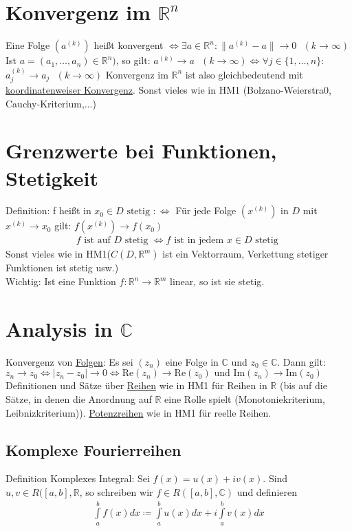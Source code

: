 \documentclass{article}
\begin{document}
\section{Konvergenz im $\mathbb{R}^n$}
Eine Folge $(a^{(k)})$ heißt konvergent $\Leftrightarrow \exists a \in \mathbb{R}^n: \lVert a^{(k)} - a \rVert \to 0 \text{ } (k \to \infty)$
Ist $a=(a_1, \ldots, a_n) \in \mathbb{R}^n)$, so gilt: $a^{(k)} \to a \text{ } (k \to \infty) \Leftrightarrow \forall j \in \{ 1, \ldots, n\}:$
$a_j^{(k)} \to a_j \text{ } (k \to \infty)$ Konvergenz im $\mathbb{R}^n$ ist also gleichbedeutend mit \underline{koordinatenweiser Konvergenz}.
Sonst vieles wie in HM1 (Bolzano-Weierstra0, Cauchy-Kriterium,...)

\section{Grenzwerte bei Funktionen, Stetigkeit}
Definition: f heißt in $x_0 \in D \text{ stetig }: \Leftrightarrow$ Für jede Folge $(x^{(k)})$ in $D$ mit $x^{(k)} \to x_0$ gilt: 
$f(x^{(k)}) \to f(x_0)$ \\
\begin{align*}
    f \text{ ist auf } D \text{ stetig } \Leftrightarrow f \text{ ist in jedem } x \in D \text{ stetig }
\end{align*}
Sonst vieles wie in HM1($C(D,\mathbb{R}^m)$ ist ein Vektorraum, Verkettung stetiger Funktionen ist stetig usw.) \\
Wichtig: Ist eine Funktion $f: \mathbb{R}^n \to \mathbb{R}^m$ linear, so ist sie stetig.

\section{Analysis in $\mathbb{C}$}
Konvergenz von \underline{Folgen}: Es sei $(z_n)$ eine Folge in $\mathbb{C}$ und $z_0 \in \mathbb{C}$. Dann gilt: 
$z_n \to z_0 \Leftrightarrow \lvert z_n - z_0 \rvert \to 0 \Leftrightarrow \text{Re}(z_n) \to \text{Re}(z_0) 
\text{ und Im}(z_n) \to \text{Im}(z_0)$ \\
Definitionen und Sätze über \underline{Reihen} wie in HM1 für Reihen in $\mathbb{R}$ (bis auf die Sätze, in denen die Anordnung auf $\mathbb{R}$
eine Rolle spielt (Monotoniekriterium, Leibnizkriterium)). \underline{Potenzreihen} wie in HM1 für reelle Reihen. 

\subsection{Komplexe Fourierreihen}
Definition Komplexes Integral:
Sei $f(x)=u(x) + iv(x)$. Sind $u,v \in R([a,b],\mathbb{R}$, so schreiben wir $f \in R([a,b],\mathbb{C})$ und definieren
\begin{align*}
    \int \limits_a^b f(x) dx \coloneqq \int \limits_a^b u(x) dx + i \int \limits_a^b v(x) dx
\end{align*}
\end{document}
